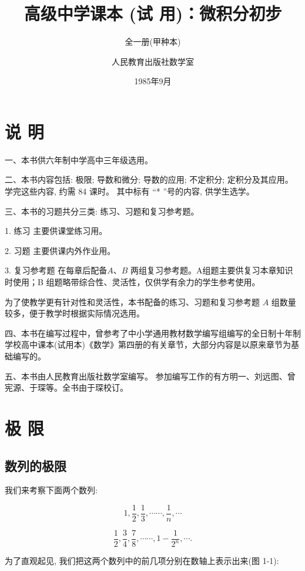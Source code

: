 \documentclass[lang=cn,newtx,12pt,scheme=chinese]{elegantbook}
\title{高级中学课本 (试 用)：微积分初步}
\subtitle{全一册(甲种本)}
\author{人民教育出版社数学室}
\institute{人民教育出版社}
\date{1985年9月}
\begin{document}
\maketitle

\chapter*{说 明}

一、本书供六年制中学高中三年级选用。

二、本书内容包括: 极限; 导数和微分; 导数的应用; 不定积分; 定积分及其应用。 学完这些内容, 约需 84 课时。 其中标有 “* ”号的内容, 供学生选学。

三、本书的习题共分三类: 练习、习题和复习参考题。

1. 练习  主要供课堂练习用。

2. 习题  主要供课内外作业用。

3. 复习参考题  在每章后配备\(A\text{、}B\) 两组复习参考题。A组题主要供复习本章知识时使用；B 组题略带综合性、灵活性，仅供学有余力的学生参考使用。

为了使教学更有针对性和灵活性，本书配备的练习、习题和复习参考题 \(A\) 组数量较多，便于教学时根据实际情况选用。

四、本书在编写过程中，曾参考了中小学通用教材数学编写组编写的全日制十年制学校高中课本(试用本)《数学》第四册的有关章节，大部分内容是以原来章节为基础编写的。

五、本书由人民教育出版社数学室编写。 参加编写工作的有方明一、刘远图、曾宪源、于琛等。全书由于琛校订。

\frontmatter

\tableofcontents

\mainmatter

\chapter{极 限}

\section{数列的极限}

我们来考察下面两个数列:

\[
1,\frac{1}{2},\frac{1}{3},\cdots \cdots ,\frac{1}{n},\cdots \tag{1}
\]

\[
\frac{1}{2},\frac{3}{4},\frac{7}{8},\cdots \cdots ,1 - \frac{1}{{2}^{n}},\cdots \text{.} \tag{2}
\]

为了直观起见, 我们把这两个数列中的前几项分别在数轴上表示出来(图 1-1):
\end{document}
